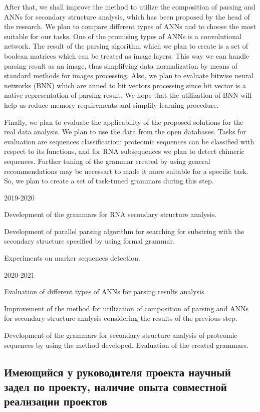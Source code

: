 \documentclass[12pt]{article}  %
\theoremstyle{remark}
\begin{document}
After that, we shall improve the method to utilize the composition of parsing and ANNs for secondary structure analysis, which has been proposed by the head of the research.
We plan to compare different types of ANNs and to choose the most suitable for our tasks.
One of the promising types af ANNs is a convolutional network.
The result of the parsing algorithm which we plan to create is a set of boolean matrices which can be treated as image layers.
This way we can handle parsing result as an image, thus simplifying data normalization by means of standard methods for images processing.
Also, we plan to evaluate bitwise neural networks (BNN) which are aimed to bit vectors processing since bit vector is a native representation of parsing result.
We hope that the utilization of BNN will help us reduce memory requirements and simplify learning procedure.

Finally, we plan to evaluate the applicability of the proposed solutions for the real data analysis.
We plan to use the data from the open databases.
Tasks for evaluation are sequences classification: proteomic sequences can be classified with respect to its functions, and for RNA subsequences we plan to detect chimeric sequences.
Further tuning of the grammar created by using general recommendations may be necessart to made it more suitable for a specific task.
So, we plan to create a set of task-tuned grammars during this step.

2019-2020

Development of the grammars for RNA secondary structure analysis.

Development of parallel parsing algorithm for searching for substring with the secondary structure specified by using formal grammar.

Experiments on marker sequences detection.


2020-2021

Evaluation of different types of ANNs for parsing results analysis.

Improvement of the method for utilization of composition of parsing and ANNs for secondary structure analysis considering the results of the previous step.

Development of the grammars for secondary structure analysis of proteomic sequences by using the method developed.
Evaluation of the created grammars.

\subsection{Имеющийся у руководителя проекта научный задел по проекту, наличие опыта совместной реализации проектов}
\end{document}
